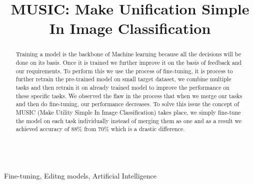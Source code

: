 \documentclass[conference]{IEEEtran}
\begin{document}
\title{MUSIC: Make Unification Simple In Image Classification \\}

\author{
\and
{}
\and
{}
\and
{}
}


\maketitle

\begin{abstract}
Training a model is the backbone of Machine learning because all the decisions will be done on its basis. Once it is trained we further improve it on the basis of feedback and our requirements. To perform this we use the process of fine-tuning, it is process to further retrain the pre-trained model on small target dataset, we combine multiple tasks and then retrain it on already trained model to improve the performance on these specific tasks. We observed the flaw in the process that when we merge our tasks and then do fine-tuning, our performance decreases. To solve this issue the concept of MUSIC (Make Utility Simple In Image Classification) takes place, we simply fine-tune the model on each task individually instead of merging them as one and as a result we achieved accuracy of 88\% from 70\% which is a drastic difference. 
\end{abstract}

\begin{IEEEkeywords}
\vspace{0.5cm} \\ Fine-tuning, Editng models, Artificial Intelligence
\end{IEEEkeywords}
\end{document}
